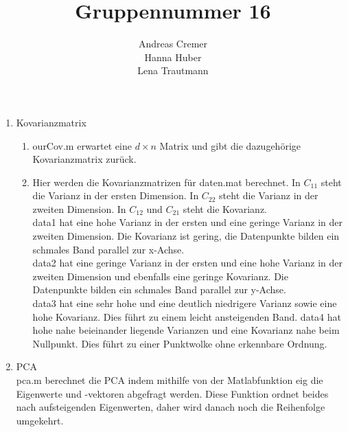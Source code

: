 \documentclass[]{report}
\title{Gruppennummer 16}
\author{Andreas Cremer\\Hanna Huber\\Lena Trautmann}
\begin{document}
\maketitle


\begin{enumerate}
	\item Kovarianzmatrix
	\begin{enumerate}
		\item
		ourCov.m erwartet eine $d \times n$ Matrix und gibt die dazugehörige Kovarianzmatrix zurück.
		\item
		Hier werden die Kovarianzmatrizen für daten.mat berechnet. In $C_{11}$ steht die Varianz in der ersten Dimension. In $C_{22}$ steht die Varianz in der zweiten Dimension. In $C_{12}$ und $C_{21}$ steht die Kovarianz.\\
		data1 hat eine hohe Varianz in der ersten und eine geringe Varianz in der zweiten Dimension. Die Kovarianz ist gering, die Datenpunkte bilden ein schmales Band parallel zur x-Achse.\\
		data2 hat eine geringe Varianz in der ersten und eine hohe Varianz in der zweiten Dimension und ebenfalls eine geringe Kovarianz. Die Datenpunkte bilden ein schmales Band parallel zur y-Achse.\\
		data3 hat eine sehr hohe und eine deutlich niedrigere Varianz sowie eine hohe Kovarianz. Dies führt zu einem leicht ansteigenden Band.
		data4 hat hohe nahe beieinander liegende Varianzen und eine Kovarianz nahe beim Nullpunkt. Dies führt zu einer Punktwolke ohne erkennbare Ordnung.
	\end{enumerate}
	\item PCA\\
	
		
		
		pca.m berechnet die PCA indem mithilfe von der Matlabfunktion eig die Eigenwerte und -vektoren abgefragt werden. Diese Funktion ordnet beides nach aufsteigenden Eigenwerten, daher wird danach noch die Reihenfolge umgekehrt.
	\begin{enumerate}
		

\end{enumerate}
\end{enumerate}
\end{document}
